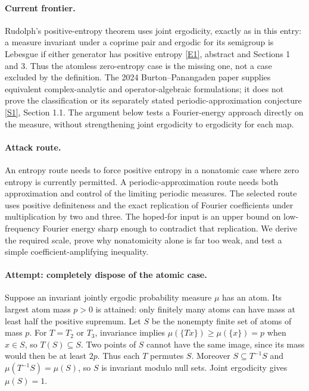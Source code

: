 \documentclass[11pt,a4paper]{article}
\newcommand{\sref}[2]{\hyperlink{source:#1:#2}{[S#2]}}
\newcommand{\eref}[2]{\hyperlink{extra:#1:#2}{[E#2]}}
\numberwithin{equation}{section}
\begin{document}
\paragraph{Current frontier.}
Rudolph's positive-entropy theorem uses joint ergodicity, exactly as in
this entry: a measure invariant under a coprime pair and ergodic for its
semigroup is Lebesgue if either generator has positive entropy
\eref{183}{1}, abstract and Sections 1 and 3. Thus the atomless zero-entropy
case is the missing one, not a case excluded by the definition. The 2024
Burton--Panangaden paper supplies equivalent complex-analytic and
operator-algebraic formulations; it does not prove the classification or
its separately stated periodic-approximation conjecture
\sref{183}{1}, Section 1.1. The argument below tests a Fourier-energy
approach directly on the measure, without strengthening joint ergodicity
to ergodicity for each map.

\paragraph{Attack route.}
An entropy route needs to force positive entropy in a nonatomic case where
zero entropy is currently permitted. A periodic-approximation route needs
both approximation and control of the limiting periodic measures. The
selected route uses positive definiteness and the exact replication of
Fourier coefficients under multiplication by two and three. The hoped-for
input is an upper bound on low-frequency Fourier energy sharp enough to
contradict that replication. We derive the required scale, prove why
nonatomicity alone is far too weak, and test a simple coefficient-amplifying
inequality.

\paragraph{Attempt: completely dispose of the atomic case.}
Suppose an invariant jointly ergodic probability measure $\mu$ has an atom.
Its largest atom mass $p>0$ is attained: only finitely many atoms can have
mass at least half the positive supremum. Let $S$ be the nonempty finite
set of atoms of mass $p$. For $T=T_2$ or $T_3$, invariance implies
$\mu(\{Tx\})\ge\mu(\{x\})=p$ when $x\in S$, so $T(S)\subseteq S$.
Two points of $S$ cannot have the same image, since its mass would then be
at least $2p$. Thus each $T$ permutes $S$. Moreover $S\subseteq T^{-1}S$
and $\mu(T^{-1}S)=\mu(S)$, so $S$ is invariant modulo null sets.
Joint ergodicity gives $\mu(S)=1$.
\end{document}
